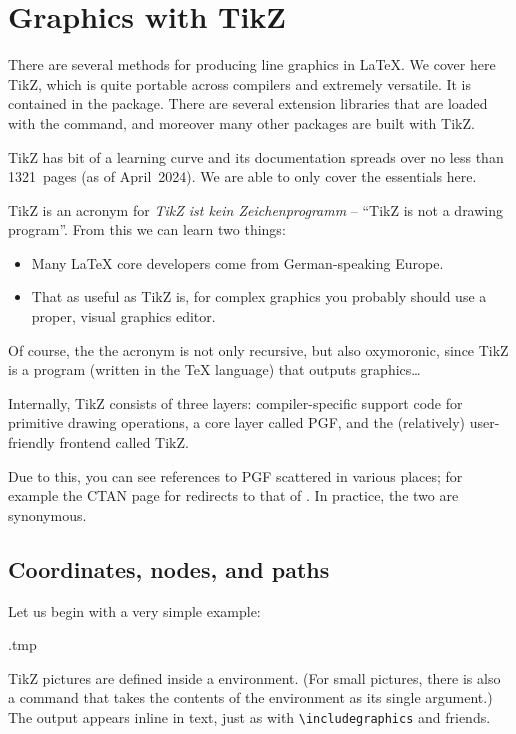 \chapter{Graphics with TikZ}

There are several methods for producing line graphics in \LaTeX.
We cover here TikZ, which is quite portable across compilers and extremely versatile.
It is contained in the  package.
There are several extension libraries that are loaded with the  command,
and moreover many other packages are built with TikZ.

TikZ has bit of a learning curve
and its documentation spreads over no less than 1321~pages (as of April~2024).
We are able to only cover the essentials here.

\begin{technote}
TikZ is an acronym for \emph{TikZ ist kein Zeichenprogramm}
-- ``TikZ is not a drawing program''.
From this we can learn two things:
\begin{itemize}
\item Many \LaTeX{} core developers come from German-speaking Europe.
\item That as useful as TikZ is,
    for complex graphics you probably should use a proper, visual graphics editor.
\end{itemize}
Of course, the the acronym is not only recursive,
but also oxymoronic, since TikZ is a program (written in the \TeX{} language)
that outputs graphics\dots
\end{technote}

\begin{technote}
Internally, TikZ consists of three layers:
compiler-specific support code for primitive drawing operations,
a core layer called PGF,
and the (relatively) user-friendly frontend called TikZ.

Due to this, you can see references to PGF scattered in various places;
for example the CTAN page for  redirects to that of .
In practice, the two are synonymous.
\end{technote}


%
%
\section{Coordinates, nodes, and paths}

Let us begin with a very simple example:
%
\begin{VerbatimOut}{\jobname.tmp}
\end{VerbatimOut}
\ShowExample
%
TikZ pictures are defined inside a  environment.
(For small pictures, there is also a  command
that takes the contents of the environment as its single argument.)
The output appears inline in text, just as with \verb|\includegraphics| and friends.

